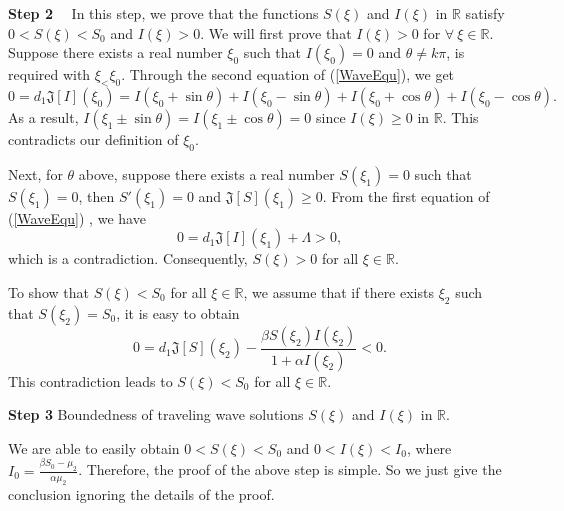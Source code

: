 \documentclass[final,3p,times]{elsarticle}
\numberwithin{equation}{section}
\begin{document}
\textbf{Step 2}%
 ~~In this step, we prove that the functions \(S(\xi)\)  and \(I(\xi)\) in \(\mathbb{R}\) satisfy \(0 < S(\xi) < S_0\) and \(I(\xi) > 0\).
We will first prove that \(I(\xi) > 0\) for  \(\forall ~\xi \in \mathbb{R}\). Suppose there exists a real number \(\xi_0\) such that \(I(\xi_0) = 0\) and \(\theta\neq k \pi\),  is required with \(\xi_<\xi_{0}\).
 Through the second equation of  (\ref{WaveEqu}), we get
\[
0 = d_1\mathfrak{J}[I](\xi_0) =I(\xi_0 + \sin\theta) + I(\xi_0 - \sin\theta)+ I(\xi_0 + \cos\theta)+I(\xi_0 - \cos\theta).
\]
As a result,  \(I(\xi_1 \pm \sin\theta) = I(\xi_1 \pm\cos\theta) = 0\) since \(I(\xi)\geq0\) in \(\mathbb{R}\). This contradicts our definition of \(\xi_0\).



Next, for  \(\theta\) above, suppose there exists a real number  \(S(\xi_{1}) = 0\) such that \(S(\xi_1) = 0\), then \(S'(\xi_1) = 0\) and \(\mathfrak{J}[S](\xi_1) \geq 0\). From the first equation of (\ref{WaveEqu}) , we have
\[
0 = d_1\mathfrak{J}[I](\xi_1) +\Lambda > 0 ,
\]
which is a contradiction. Consequently, \(S(\xi) > 0\) for all \(\xi \in \mathbb{R}\).

To show that \(S(\xi)<S_0\) for all \(\xi\in\mathbb{R}\), we assume that if there exists \(\xi_2\) such that \(S(\xi_2) = S_0\), it is easy to obtain
\[
0 = d_1\mathfrak{J}[S](\xi_2)-\frac{\beta S(\xi_2)I(\xi_2)}{1+\alpha I(\xi_2)}<0.
\]
This contradiction leads to \(S(\xi)<S_0\) for all \(\xi\in\mathbb{R}\).

\textbf{Step 3 }Boundedness of traveling wave solutions \(S(\xi)\) and \(I(\xi)\) in \(\mathbb{R}\).

We are able to easily obtain \(0<S(\xi)<S_{0}\) and \(0<I(\xi)<I_{0}\), where $I_0= \displaystyle\frac{\beta S_0 - \mu_{2}}{\alpha \mu_{2}}$. Therefore, the proof of the above step is simple. So we just give the conclusion ignoring the details of the proof.
\end{document}
